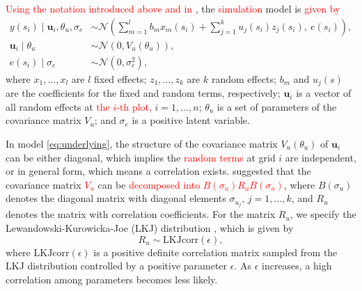 \documentclass[a4paper]{article} 	%
\newcommand{\N}{\mathcal{N}}
\newcommand{\revision}[1]{\textcolor{red}{#1}}
\begin{document}
\revision{Using the notation introduced above and in \textcite{Cao2022Bayesian}}, the \revision{simulation} model is \revision{given by} 
\begin{equation}\label{eq:underlying}
	\begin{split}
		y(s_i)\mid \bm{u}_i,\theta_u,\sigma_e &\sim \N\left( \sum_{m=1}^{l}b_m x_m(s_i) + \sum_{j=1}^{k}u_j(s_i)z_j(s_i),~e(s_i)\right), \\
		\bm{u}_i \mid \theta_u &\sim \N(0,V_u(\theta_u)), \\
		e(s_i) \mid \sigma_e &\sim \N(0,\sigma_e^2), 
	\end{split}
\end{equation}
where $x_1,\ldots, x_l$ are $l$ fixed effects; $z_1,\ldots, z_k$ are $k$ random effects; $b_m$ and $u_j(s)$ are the coefficients for the fixed and random terms, respectively; $\bm{u}_i$ is a vector of all random effects at \revision{the $i$-th plot,} %
$i=1,\ldots,n$; $\theta_u$ is a set of parameters of the covariance matrix $V_u$; and $\sigma_e$ is a positive latent variable. 
	

In model \eqref{eq:underlying}, the structure of the covariance matrix $V_u(\theta_u)$ of $\bm{u}_i$ can be either diagonal, which implies the \revision{random terms} at grid $i$ are independent, or in general form, which means a correlation exists. \textcite{McElreath2015Statistical} suggested that the covariance matrix \revision{$V_u$} can be \revision{decomposed into $B(\sigma_u)R_uB(\sigma_u)$}, where $B(\sigma_u)$ denotes the diagonal matrix with diagonal elements $\sigma_{u_j}$, $j=1,\ldots,k$, and $R_u$ denotes the matrix with correlation coefficients. For the matrix $R_u$, we specify the Lewandowski-Kurowicka-Joe (LKJ) distribution \parencite{Lewandowski2009Generating}, which is given by
\begin{equation}\label{eq:RPrior}
    R_u \sim \text{LKJcorr}(\epsilon),
\end{equation}
where $\text{LKJcorr}(\epsilon)$ is a positive definite correlation matrix sampled from the LKJ distribution controlled by a positive parameter $\epsilon$. As $\epsilon$ increases, a high correlation among parameters becomes less likely. 
\end{document}

